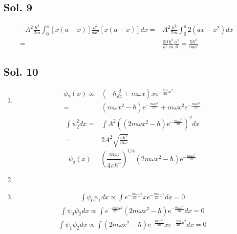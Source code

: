 \subsection*{Sol. 9}

\begin{align*}
    -A^2\frac{\hbar^2}{2m}\int_0^a[x(a-x)]\frac{d^2}{dx^2}[x(a-x)]dx = &
    A^2\frac{\hbar^2}{2m}\int_0^a2(ax-x^2)dx\\
    =&\frac{30}{a^5}\frac{\hbar^2}{m}\frac{a^3}{6} = \frac{5\hbar^2}{ma^2}
\end{align*}


\subsection*{Sol. 10}
\begin{enumerate}
    \item \begin{align*}
        \psi_2(x) \propto & 
        (-\hbar\frac{d}{dx}+m\omega x)xe^{-\frac{m\omega}{2\hbar}x^2} \\
        = &
    \left(m{\omega}x^{2} -
    \hbar\right) \mathrm{e}^{-\frac{m{\omega}x^{2}}{2\hbar}}
    +m\omega x^2\mathrm{e}^{-\frac{m{\omega}x^{2}}{2\hbar}}
    \end{align*}
    \begin{align*}
        \int\psi_2^2dx = &
        \int A^2(\left( 2m{\omega}x^{2} -
    \hbar\right) \mathrm{e}^{-\frac{m{\omega}x^{2}}{2\hbar}})^2dx\\
    =&2A^2\sqrt{\frac{\pi\hbar^5}{m\omega}}
    \end{align*}
    $$
    \psi_2(x) = \left(\frac{m\omega}{4\pi\hbar^5}\right)^{1/4}
    \left( 2m{\omega}x^{2} -
    \hbar\right) \mathrm{e}^{-\frac{m{\omega}x^{2}}{2\hbar}}
    $$
    \item 

    \item 
    \begin{align*}
        \int\psi_0\psi_1dx \propto 
        \int e^{-\frac{m\omega}{2\hbar}x^2}xe^{-\frac{m\omega}{2\hbar}x^2}dx = 0
    \end{align*}
    \begin{align*}
        \int\psi_0\psi_2dx \propto 
        \int e^{-\frac{m\omega}{2\hbar}x^2}\left( 2m{\omega}x^{2} -
    \hbar\right) \mathrm{e}^{-\frac{m{\omega}x^{2}}{2\hbar}}dx = 0
    \end{align*}
    \begin{align*}
        \int\psi_1\psi_2dx \propto 
        \int \left( 2m{\omega}x^{2} -
    \hbar\right) \mathrm{e}^{-\frac{m{\omega}x^{2}}{2\hbar}}
    xe^{-\frac{m\omega}{2\hbar}x^2}dx = 0
    \end{align*}
    
\end{enumerate}


